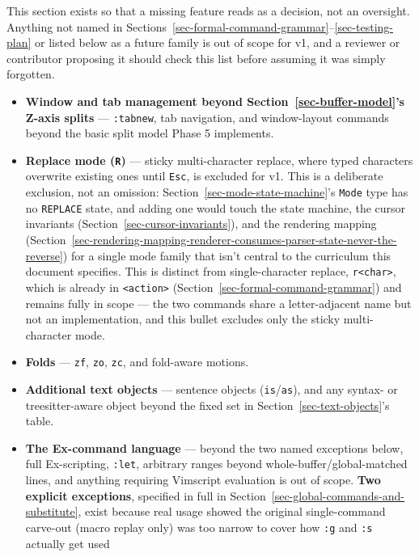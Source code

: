 \documentclass[11pt]{article}
\providecommand{\tightlist}{%
  \setlength{\itemsep}{0pt}\setlength{\parskip}{0pt}}
\begin{document}
This section exists so that a missing feature reads as a decision, not an
oversight. Anything not named in Sections~\ref{sec-formal-command-grammar}--\ref{sec-testing-plan} or listed below as a future
family is out of scope for v1, and a reviewer or contributor proposing it
should check this list before assuming it was simply forgotten.

\begin{itemize}
\tightlist
\item
  \textbf{Window and tab management beyond Section~\ref{sec-buffer-model}'s Z-axis splits} --- \texttt{:tabnew},
  tab navigation, and window-layout commands beyond the basic split model
  Phase 5 implements.
\item
  \textbf{Replace mode (\texttt{R})} --- sticky multi-character replace, where typed
  characters overwrite existing ones until \texttt{Esc}, is excluded for v1. This
  is a deliberate exclusion, not an omission: Section~\ref{sec-mode-state-machine}'s \texttt{Mode} type has no
  \texttt{REPLACE} state, and adding one would touch the state machine, the cursor
  invariants (Section~\ref{sec-cursor-invariants}), and the rendering mapping (Section~\ref{sec-rendering-mapping-renderer-consumes-parser-state-never-the-reverse}) for a
  single mode family that isn't central to the curriculum this document
  specifies. This is distinct from single-character replace, \texttt{r\textless{}char\textgreater{}},
  which is already in \texttt{\textless{}action\textgreater{}} (Section~\ref{sec-formal-command-grammar}) and remains fully in scope ---
  the two commands share a letter-adjacent name but not an implementation,
  and this bullet excludes only the sticky multi-character mode.
\item
  \textbf{Folds} --- \texttt{zf}, \texttt{zo}, \texttt{zc}, and fold-aware motions.
\item
  \textbf{Additional text objects} --- sentence objects (\texttt{is}/\texttt{as}), and any
  syntax- or treesitter-aware object beyond the fixed set in Section~\ref{sec-text-objects}'s
  table.
\item
  \textbf{The Ex-command language} --- beyond the two named exceptions below, full
  Ex-scripting, \texttt{:let}, arbitrary ranges beyond whole-buffer/global-matched
  lines, and anything requiring Vimscript evaluation is out of scope.
  \textbf{Two explicit exceptions}, specified in full in Section~\ref{sec-global-commands-and-substitute}, exist
  because real usage showed the original single-command carve-out (macro
  replay only) was too narrow to cover how \texttt{:g} and \texttt{:s} actually get used

\end{itemize}
\end{document}
